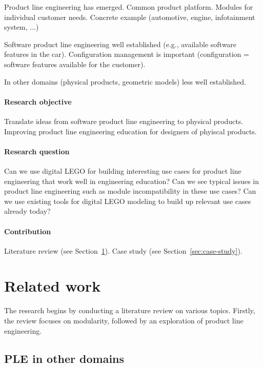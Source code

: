 \documentclass[sigconf,review]{acmart}
\begin{document}
Product line engineering has emerged. Common product platform. Modules for individual customer needs. Concrete example (automotive, engine, infotainment system, ...)

Software product line engineering well established (e.g., available software features in the car). Configuration management is important (configuration = software features available for the customer).

In other domains (physical products, geometric models) less well established.

\paragraph{Research objective}

Translate ideas from software product line engineering to physical products.
Improving product line engineering education for designers of phyiscal products.

\paragraph{Research question}

Can we use digital LEGO for building interesting use cases for product line engineering that work well in engineering education?
Can we see typical issues in product line engineering such as module incompatibility in these use cases?
Can we use existing tools for digital LEGO modeling to build up relevant use cases already today?

\paragraph{Contribution}

Literature review (see Section~\ref{sec:related-work}). Case study (see Section~\ref{sec:case-study}).

\section{Related work}
\label{sec:related-work}

The research begins by conducting a literature review on various topics. 
Firstly, the review focuses on modularity, followed by an exploration of product line engineering.

\subsection{PLE in other domains}
\label{sec:modualarity}
\end{document}
